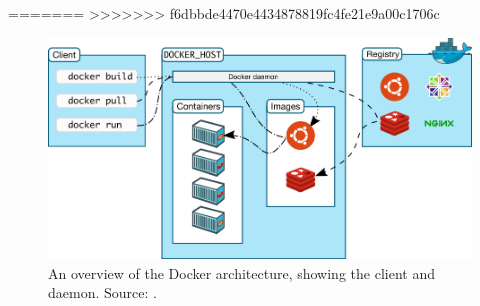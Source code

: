 =======
>>>>>>> f6dbbde4470e4434878819fc4fe21e9a00c1706c
\begin{figure}[H]
\caption{An overview of the Docker architecture, showing the client and daemon. Source: \cite{dockerarchi}.}
\centering
\includegraphics[scale=0.4]{4-softwarearch/images/architecture.png}
\end{figure}

